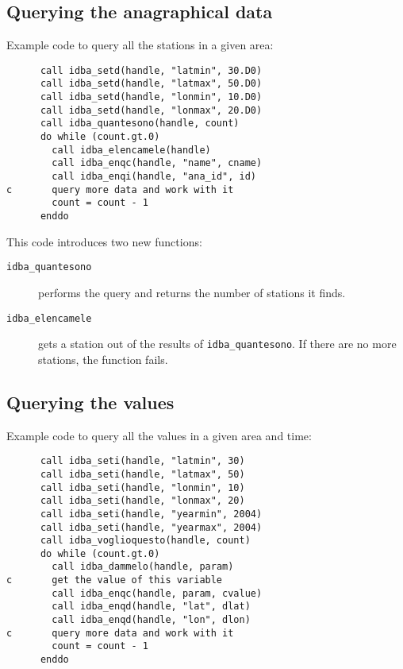\documentclass[draft,12pt,a4paper,twoside]{book}
\begin{document}
\subsection {Querying the anagraphical data}

Example code to query all the stations in a given area:
\label{fun-idba_quantesono}
\label{fun-idba_elencamele}

\begin{verbatim}
      call idba_setd(handle, "latmin", 30.D0)
      call idba_setd(handle, "latmax", 50.D0)
      call idba_setd(handle, "lonmin", 10.D0)
      call idba_setd(handle, "lonmax", 20.D0)
      call idba_quantesono(handle, count)
      do while (count.gt.0)
        call idba_elencamele(handle)
        call idba_enqc(handle, "name", cname)
        call idba_enqi(handle, "ana_id", id)
c       query more data and work with it
        count = count - 1
      enddo
\end{verbatim}

This code introduces two new functions:

\begin{description}
\item[{\tt idba\_quantesono}]
  performs the query and returns the number of stations it finds.

\item[{\tt idba\_elencamele}]
  gets a station out of the results of {\tt idba\_quantesono}.  If there are no
  more stations, the function fails.
\end{description}

\subsection {Querying the values}

Example code to query all the values in a given area and time:
\label{fun-idba_voglioquesto}
\label{fun-idba_dammelo}

\begin{verbatim}
      call idba_seti(handle, "latmin", 30)
      call idba_seti(handle, "latmax", 50)
      call idba_seti(handle, "lonmin", 10)
      call idba_seti(handle, "lonmax", 20)
      call idba_seti(handle, "yearmin", 2004)
      call idba_seti(handle, "yearmax", 2004)
      call idba_voglioquesto(handle, count)
      do while (count.gt.0)
        call idba_dammelo(handle, param)
c       get the value of this variable
        call idba_enqc(handle, param, cvalue)
        call idba_enqd(handle, "lat", dlat)
        call idba_enqd(handle, "lon", dlon)
c       query more data and work with it
        count = count - 1
      enddo
\end{verbatim}
   
\end{document}
